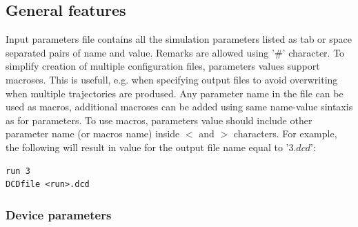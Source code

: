 \documentclass[a4paper]{article}
\begin{document}
\subsection{General features}
\label{sec:par.general}

Input parameters file contains all the simulation parameters listed as tab or space separated pairs of name and value. Remarks are allowed using '$\#$' character. To simplify creation of multiple configuration files, parameters values support macroses. This is usefull, e.g. when specifying output files to avoid overwriting when multiple trajectories are prodused. Any parameter name in the file can be used as macros, additional macroses can be added using same name-value sintaxis as for parameters. To use macros, parameters value should include other parameter name (or macros name) inside $<$ and $>$ characters. For example, the following will result in value for the output file name equal to '$3.dcd$':

\begin{verbatim}
run 3
DCDfile <run>.dcd
\end{verbatim}

\subsubsection{Device parameters}
\label{sec:par.device}
\end{document}
